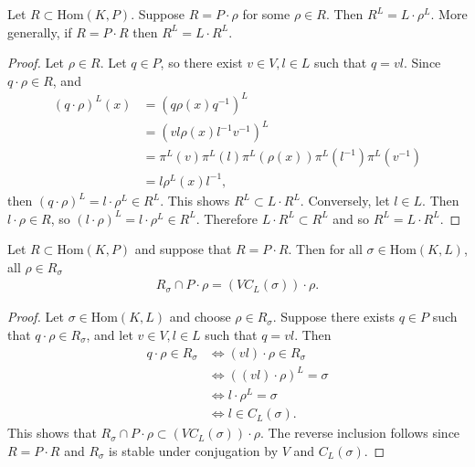 \begin{lemma} \label{pr:lrl} Let $R \subset \mathrm{Hom}(K, P)$. Suppose $R = P \cdot \rho$ for some $\rho \in R$. Then $R^L = L\cdot \rho^L$.
	More generally, if $R = P \cdot R$ then $R^L = L \cdot R^L$.
\end{lemma}
\begin{proof}
	Let $\rho \in R$. Let $q \in P$, so there exist $v \in V, l \in L$ such that $q = vl$. Since $q\cdot\rho \in R$, and
	\begin{align*}
		(q \cdot \rho)^L(x) &= (q\rho(x)q^{-1})^L \\
			&= (vl\rho(x)l^{-1}v^{-1})^L \\
			&= \pi^L(v)\pi^L(l)\pi^L(\rho(x))\pi^L\left(l^{-1}\right)\pi^L\left(v^{-1}\right) \\
			&= l \rho^L(x) l^{-1},
	\end{align*}
	then $(q \cdot \rho)^L = l \cdot \rho^L \in R^L$. This shows $R^L \subset L \cdot R^L$. Conversely, let $l \in L$. Then $l \cdot \rho \in R$, so $(l \cdot \rho)^L = l\cdot \rho^L \in R^L$. Therefore $L\cdot R^L \subset R^L$ and so $R^L = L \cdot R^L$.
\end{proof}

\begin{lemma} \label{rsigma:vcl} Let $R \subset \mathrm{Hom}(K, P)$ and suppose that $R = P \cdot R$. Then for all $\sigma \in \mathrm{Hom}(K, L)$, all $\rho\in R_\sigma$
	\begin{align*}
		R_\sigma \cap P \cdot \rho = \left(VC_L(\sigma)\right) \cdot \rho.
	\end{align*}
\end{lemma}
\begin{proof}
	Let $\sigma \in \mathrm{Hom}(K, L)$ and choose $\rho \in R_\sigma$. Suppose there exists $q \in P$ such that $q \cdot \rho \in R_\sigma$, and let $v \in V, l \in L$ such that $q = vl$. Then
	\begin{align*}
		q \cdot \rho \in R_\sigma &\Leftrightarrow (vl) \cdot \rho \in R_\sigma \\
		&\Leftrightarrow \left( (vl) \cdot \rho\right)^L = \sigma \\
		&\Leftrightarrow l\cdot \rho^L = \sigma \\
		&\Leftrightarrow l \in C_L(\sigma).
	\end{align*}
	This shows that $R_\sigma \cap P \cdot \rho \subset \left(VC_L(\sigma)\right) \cdot \rho$. The reverse inclusion follows since $R = P \cdot R$ and $R_\sigma$ is stable under conjugation by $V$ and $C_L(\sigma)$.
\end{proof}

